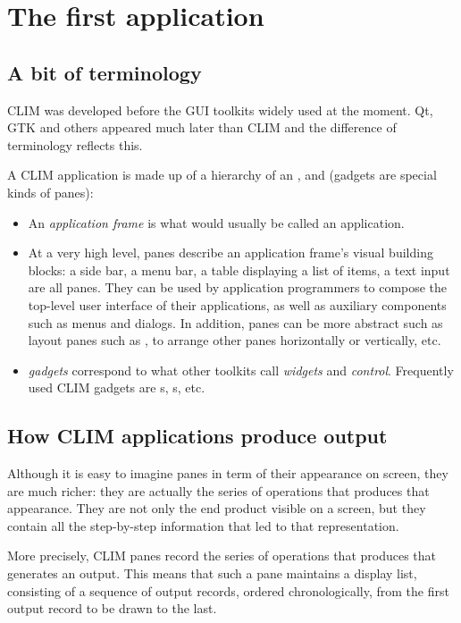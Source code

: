 \chapter{The first application}


\section{A bit of terminology}

CLIM was developed before the GUI toolkits widely used at the moment.
Qt, GTK and others appeared much later than CLIM and the difference of
terminology reflects this.

A CLIM application is made up of a hierarchy of an ,  and  (gadgets are special kinds
of panes):

\begin{itemize}
\item
  An \emph{application frame} is what would usually be called an
  application.

\item
  At a very high level, panes describe an application frame's visual
  building blocks: a side bar, a menu bar, a table displaying a list
  of items, a text input are all panes. They can be used by
  application programmers to compose the top-level user interface of
  their applications, as well as auxiliary components such as menus
  and dialogs. In addition, panes can be more abstract such as layout
  panes such as ,  to arrange other panes
  horizontally or vertically, etc.

\item
  \emph{gadgets} correspond to what other toolkits call \emph{widgets}
  and \emph{control}.  Frequently used CLIM gadgets are
  s, s, etc.
\end{itemize}


\section{How CLIM applications produce output}

Although it is easy to imagine panes in term of their appearance on
screen, they are much richer: they are actually the series of
operations that produces that appearance. They are not only the end
product visible on a screen, but they contain all the step-by-step
information that led to that representation.

More precisely, CLIM panes record the series of operations that
produces that generates an output.  This means that such a pane
maintains a display list, consisting of a sequence of output records,
ordered chronologically, from the first output record to be drawn to
the last.

